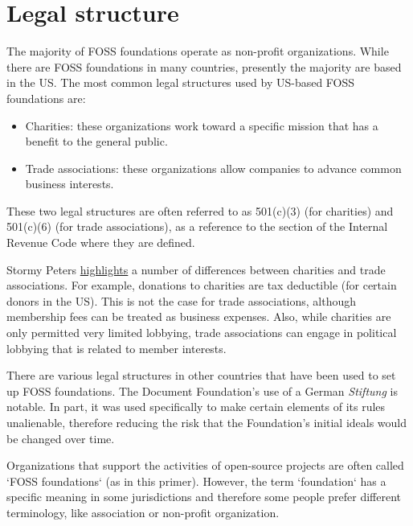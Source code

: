 


\chapter{Legal structure}

The majority of FOSS foundations operate as non-profit organizations.  While there are FOSS foundations in many countries, presently the majority are based in the US.  The most common legal structures used by US-based FOSS foundations are:

\begin{itemize}

\itemsep 0.50em

\item Charities: these organizations work toward a specific mission that has a benefit to the general public.

\item Trade associations: these organizations allow companies to advance common business interests.

\end {itemize}

These two legal structures are often referred to as 501(c)(3) (for charities) and 501(c)(6) (for trade associations), as a reference to the section of the Internal Revenue Code where they are defined.

Stormy Peters \href{http://stormyscorner.com/2008/08/501c-3-versus-6.html}{highlights} a number of differences between charities and trade associations.  For example, donations to charities are tax deductible (for certain donors in the US).  This is not the case for trade associations, although membership fees can be treated as business expenses.  Also, while charities are only permitted very limited lobbying, trade associations can engage in political lobbying that is related to member interests.

There are various legal structures in other countries that have been used to set up FOSS foundations.  The Document Foundation's use of a German \textit{Stiftung} is notable.  In part, it was used specifically to make certain elements of its rules unalienable, therefore reducing the risk that the Foundation's initial ideals would be changed over time.

\begin{kaobox}[frametitle=FOSS foundations: what's in a name?]

Organizations that support the activities of open-source projects are often called `FOSS foundations` (as in this primer).  However, the term `foundation` has a specific meaning in some jurisdictions and therefore some people prefer different terminology, like association or non-profit organization.

\end{kaobox}

